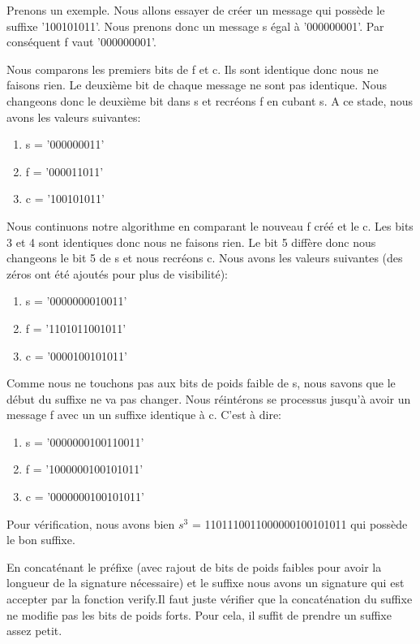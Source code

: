 \documentclass[a4,12pt]{article}
\begin{document}
Prenons un exemple. Nous allons essayer de créer un message qui possède le suffixe '100101011'. Nous prenons donc un message s égal à '000000001'. Par conséquent f vaut '000000001'.

Nous comparons les premiers bits de f et c. Ils sont identique donc nous ne faisons rien.
Le deuxième bit de chaque message ne sont pas identique. Nous changeons donc le deuxième bit dans s et recréons f en cubant s. A ce stade, nous avons les valeurs suivantes:
\begin{center}
\begin{enumerate}
\item s = '000000011'
\item f = '000011011'
\item c = '100101011'
\end{enumerate}
\end{center}
Nous continuons notre algorithme en comparant le nouveau f créé et le c. Les bits 3 et 4 sont identiques donc nous ne faisons rien.
Le bit 5 diffère donc nous changeons le bit 5 de s et nous recréons c. Nous avons les valeurs suivantes (des zéros ont été ajoutés pour plus de visibilité):
\begin{center}
\begin{enumerate}
\item s = '0000000010011'
\item f = '1101011001011'
\item c = '0000100101011'
\end{enumerate}
\end{center}
Comme nous ne touchons pas aux bits de poids faible de s, nous savons que le début du suffixe ne va pas changer. Nous réintérons se processus jusqu'à avoir un message f avec un un suffixe identique à c. C'est à dire:
\begin{center}
\begin{enumerate}
\item s = '0000000100110011'
\item f = '1000000100101011'
\item c = '0000000100101011'
\end{enumerate}
\end{center}

Pour vérification, nous avons bien $s^{3}$ = 1101110011000000100101011 qui possède le bon suffixe.

En concaténant le préfixe (avec rajout de bits de poids faibles pour avoir la longueur de la signature nécessaire) et le suffixe nous avons un signature qui est accepter par la fonction verify.Il faut juste vérifier que la concaténation du suffixe ne modifie pas les bits de poids forts. Pour cela, il suffit de prendre un suffixe assez petit.
\end{document}
